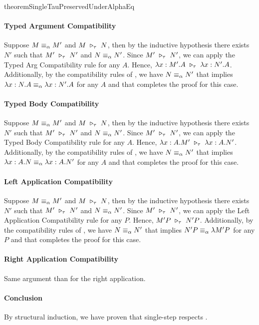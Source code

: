 \begin{longproof}{theoremSingleTauPreservedUnderAlphaEq}
\paragraph{Typed Argument Compatibility}
Suppose $M \equiv_\alpha M'$ and $M \ \triangleright_{\tau}\  N$, then by the inductive hypothesis there exists $N'$ such that $M' \ \triangleright_{\tau}\  N'$ and $N \equiv_\alpha N'$. Since $M' \ \triangleright_{\tau}\  N'$, we can apply the Typed Arg Compatibility rule for any $A$. Hence, $\lambda x:M'.A \ \triangleright_{\tau}\  \lambda x:N'.A$. Additionally, by the compatibility rules of \alphaequivalence, we have $N \equiv_\alpha N'$ that implies $\lambda x:N.A \equiv_\alpha \lambda x:N'.A$ for any $A$ and that completes the proof for this case.

\paragraph{Typed Body Compatibility}
Suppose $M \equiv_\alpha M'$ and $M \ \triangleright_{\tau}\  N$, then by the inductive hypothesis there exists $N'$ such that $M' \ \triangleright_{\tau}\  N'$ and $N \equiv_\alpha N'$. Since $M' \ \triangleright_{\tau}\  N'$, we can apply the Typed Body Compatibility rule for any $A$. Hence, $\lambda x:A.M' \ \triangleright_{\tau}\  \lambda x:A.N'$. Additionally, by the compatibility rules of \alphaequivalence, we have $N \equiv_\alpha N'$ that implies $\lambda x:A.N \equiv_\alpha \lambda x:A.N'$ for any $A$ and that completes the proof for this case.

\paragraph{Left Application Compatibility}
Suppose $M \equiv_\alpha M'$ and $M \ \triangleright_{\tau}\  N$, then by the inductive hypothesis there exists $N'$ such that $M' \ \triangleright_{\tau}\  N'$ and $N \equiv_\alpha N'$. Since $M' \ \triangleright_{\tau}\  N'$, we can apply the Left Application Compatibility rule for any $P$. Hence, $M'P \ \triangleright_{\tau}\  N'P$. Additionally, by the compatibility rules of \alphaequivalence, we have $N \equiv_\alpha N'$ that implies $N'P \equiv_\alpha \lambda M'P$ for any $P$ and that completes the proof for this case.

\paragraph{Right Application Compatibility}
Same argument than for the right application.

\paragraph{Conclusion}
By structural induction, we have proven that single-step \taureduction respects \alphaequivalence.

\end{longproof}


